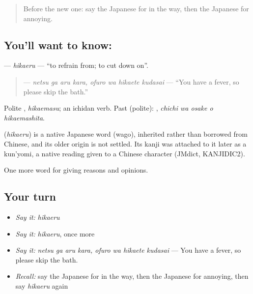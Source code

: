 \begin{quote}
Before the new one: say the Japanese for in the way, then the Japanese for annoying.
\end{quote}

\subsection*{You'll want to know: }
\textbf{} — \emph{hikaeru} — \textquotedblleft{}to refrain from; to cut down on\textquotedblright{}.

\begin{quote}
\textbf{   } — \emph{netsu ga aru kara, ofuro wa hikaete kudasai} — \textquotedblleft{}You have a fever, so please skip the bath.\textquotedblright{}
\end{quote}

Polite \textbf{}, \emph{hikaemasu}; an ichidan verb. Past (polite): \textbf{  }, \emph{chichi wa osake o hikaemashita}.

\begin{cousinweb}
\textbf{} (\emph{hikaeru}) is a native Japanese word (wago), inherited rather than borrowed from Chinese, and its older origin is not settled. Its kanji was attached to it later as a kun'yomi, a native reading given to a Chinese character (JMdict, KANJIDIC2).
\end{cousinweb}

\begin{grammarlens}[title={What you've built}]
One more word for giving reasons and opinions.
\end{grammarlens}

\subsection*{Your turn}
\begin{itemize}
\raggedright
  \item \emph{Say it:} \emph{hikaeru}
  \item \emph{Say it:} \emph{hikaeru}, once more
  \item \emph{Say it:} \emph{netsu ga aru kara, ofuro wa hikaete kudasai} — You have a fever, so please skip the bath.
  \item \emph{Recall:} say the Japanese for in the way, then the Japanese for annoying, then say \emph{hikaeru} again
\end{itemize}

